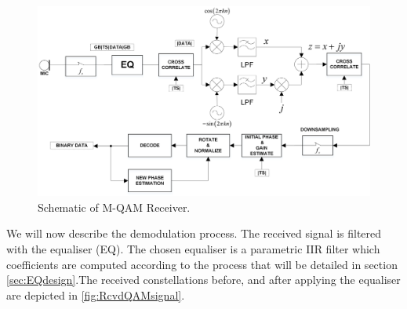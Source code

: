 \documentclass[12pt,a4paper,openright]{report}
\begin{document}
\begin{figure}[h]
  \centering
    \includegraphics[width=1\textwidth]{rcvrSchem.png}
    \caption[Schematic of M-QAM Receiver]{Schematic of M-QAM Receiver.}
    \label{fig:SchemMQAMrecvr}
\end{figure}


We will now describe the demodulation process. The received signal is filtered with the equaliser (EQ). The chosen equaliser is a parametric IIR filter which coefficients are computed according to the process that will be detailed in section \ref{sec:EQdesign}.The received constellations before, and after applying the equaliser are depicted in \ref{fig:RcvdQAMsignal}.
 
\end{document}
